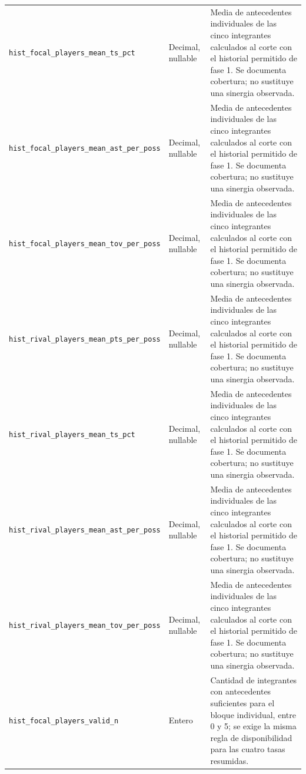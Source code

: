 \begin{longtable}{@{}>{\raggedright\arraybackslash}p{5.0cm}>{\raggedright\arraybackslash}p{1.9cm}>{\raggedright\arraybackslash}p{7.7cm}@{}}
\texttt{hist\_\allowbreak focal\_\allowbreak players\_\allowbreak mean\_\allowbreak ts\_\allowbreak pct} & Decimal, nullable & Media de antecedentes individuales de las cinco integrantes calculados al corte con el historial permitido de fase 1. Se documenta cobertura; no sustituye una sinergia observada.\\
\texttt{hist\_\allowbreak focal\_\allowbreak players\_\allowbreak mean\_\allowbreak ast\_\allowbreak per\_\allowbreak poss} & Decimal, nullable & Media de antecedentes individuales de las cinco integrantes calculados al corte con el historial permitido de fase 1. Se documenta cobertura; no sustituye una sinergia observada.\\
\texttt{hist\_\allowbreak focal\_\allowbreak players\_\allowbreak mean\_\allowbreak tov\_\allowbreak per\_\allowbreak poss} & Decimal, nullable & Media de antecedentes individuales de las cinco integrantes calculados al corte con el historial permitido de fase 1. Se documenta cobertura; no sustituye una sinergia observada.\\
\texttt{hist\_\allowbreak rival\_\allowbreak players\_\allowbreak mean\_\allowbreak pts\_\allowbreak per\_\allowbreak poss} & Decimal, nullable & Media de antecedentes individuales de las cinco integrantes calculados al corte con el historial permitido de fase 1. Se documenta cobertura; no sustituye una sinergia observada.\\
\texttt{hist\_\allowbreak rival\_\allowbreak players\_\allowbreak mean\_\allowbreak ts\_\allowbreak pct} & Decimal, nullable & Media de antecedentes individuales de las cinco integrantes calculados al corte con el historial permitido de fase 1. Se documenta cobertura; no sustituye una sinergia observada.\\
\texttt{hist\_\allowbreak rival\_\allowbreak players\_\allowbreak mean\_\allowbreak ast\_\allowbreak per\_\allowbreak poss} & Decimal, nullable & Media de antecedentes individuales de las cinco integrantes calculados al corte con el historial permitido de fase 1. Se documenta cobertura; no sustituye una sinergia observada.\\
\texttt{hist\_\allowbreak rival\_\allowbreak players\_\allowbreak mean\_\allowbreak tov\_\allowbreak per\_\allowbreak poss} & Decimal, nullable & Media de antecedentes individuales de las cinco integrantes calculados al corte con el historial permitido de fase 1. Se documenta cobertura; no sustituye una sinergia observada.\\
\texttt{hist\_\allowbreak focal\_\allowbreak players\_\allowbreak valid\_\allowbreak n} & Entero & Cantidad de integrantes con antecedentes suficientes para el bloque individual, entre 0 y 5; se exige la misma regla de disponibilidad para las cuatro tasas resumidas.\\

\end{longtable}
